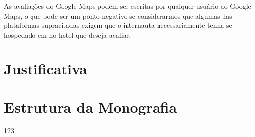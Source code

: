 As avaliações do Google Maps podem ser escritas por qualquer usuário do Google Maps, o que pode ser um ponto negativo se considerarmos que algumas das plataformas supracitadas exigem que o internauta necessariamente tenha se hospedado em no hotel que deseja avaliar.

\begin{comment}
O presente relatório está estruturado da seguinte forma: o capítulo~\ref{cap:justificativa} apresenta… o capítulo~\ref{cap:fund_teorica} ... O capítulo~\ref{cap:metodologia} ..., o capítulo~\ref{cap:resultados} ... O capítulo~\ref{cap:conclusao} 

Demonstração de citação: o software de análise foi desenvolvido na linguagem Python~\cite{van1995python}, usando as bibliotecas Pandas~\cite{mckinney2010data} e Scikit-learn~\cite{scikit-learn}.
\end{comment}

\begin{comment}
    como o sentimento dos usuários que avaliaram o estabelecimento variou durante o tempo, se o recinto está recebendo avaliações com sentimentos mais positivos ou se a tendência é de que as avaliações continuem com sentimentos cada vez mais negativos, e identificar possíveis mudanças de comportamento, que para esses cenários podem ser justificados por mudanças de equipe, mudanças de políticas internas da empresa ou por uma simples manutenção ou evolução das instalações
    , a fim de observar e entender as variações de sentimentos das avaliações realizadas pelos usuários da plataforma distribuídos durante o tempo.
\end{comment}

\section{Justificativa}
\begin{comment}
Estamos vivendo em um mundo com muitas informações disponíveis e de fácil acesso, porém esta cada vez mais difícil filtrar e escolher as informações que vão fornecer mais insumo para o internauta.
\end{comment}


\section{Estrutura da Monografia}

123